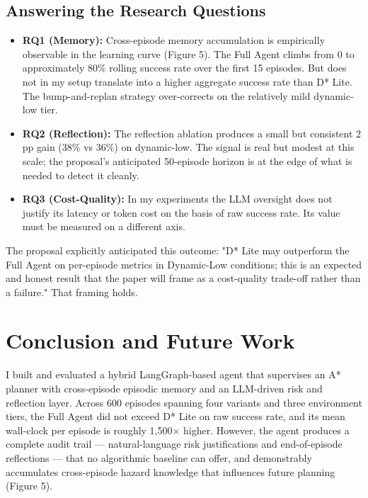 \documentclass[11pt, letterpaper]{article}
\begin{document}
\subsection{Answering the Research Questions}

\begin{itemize}
    \item \textbf{RQ1 (Memory):} Cross-episode memory accumulation is empirically observable in the learning curve (Figure 5). The Full Agent climbs from 0 to approximately 80\% rolling success rate over the first 15 episodes. But does not in my setup translate into a higher aggregate success rate than D* Lite. The bump-and-replan strategy over-corrects on the relatively mild dynamic-low tier.
    \item \textbf{RQ2 (Reflection):} The reflection ablation produces a small but consistent 2 pp gain (38\% vs 36\%) on dynamic-low. The signal is real but modest at this scale; the proposal's anticipated 50-episode horizon is at the edge of what is needed to detect it cleanly.
    \item \textbf{RQ3 (Cost-Quality):} In my experiments the LLM oversight does not justify its latency or token cost on the basis of raw success rate. Its value must be measured on a different axis.
\end{itemize}

The proposal explicitly anticipated this outcome: "D* Lite may outperform the Full Agent on per-episode metrics in Dynamic-Low conditions; this is an expected and honest result that the paper will frame as a cost-quality trade-off rather than a failure." That framing holds.

\section{Conclusion and Future Work}
I built and evaluated a hybrid LangGraph-based agent that supervises an A* planner with cross-episode episodic memory and an LLM-driven risk and reflection layer. Across 600 episodes spanning four variants and three environment tiers, the Full Agent did not exceed D* Lite on raw success rate, and its mean wall-clock per episode is roughly 1,500× higher. However, the agent produces a complete audit trail --- natural-language risk justifications and end-of-episode reflections --- that no algorithmic baseline can offer, and demonstrably accumulates cross-episode hazard knowledge that influences future planning (Figure 5).
\end{document}
